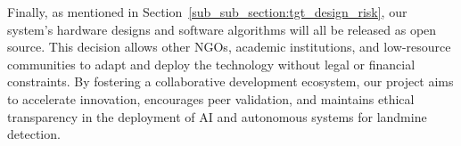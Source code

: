 Finally, as mentioned in Section~\ref{sub_sub_section:tgt_design_risk}, our system’s hardware designs and software algorithms will all be released as open source. This decision allows other \gls{NGOs}, academic institutions, and low-resource communities to adapt and deploy the technology without legal or financial constraints. By fostering a collaborative development ecosystem, our project aims to accelerate innovation, encourages peer validation, and maintains ethical transparency in the deployment of AI and autonomous systems for landmine detection.
